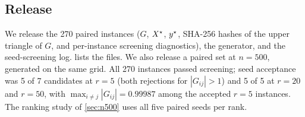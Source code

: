\subsection{Release}
We release the 270 paired instances ($G$, $X^\star$, $y^\star$, SHA-256 hashes of the
upper triangle of $G$, and per-instance screening diagnostics), the generator,
and the seed-screening log.  lists the files.
We also release a paired set at $n=500$, generated on the same grid. All 270
instances passed screening; seed acceptance was 5 of 7 candidates at $r=5$
(both rejections for $|G_{ij}|>1$) and 5 of 5 at $r=20$ and $r=50$, with
$\max_{i\ne j}|G_{ij}|=0.99987$ among the accepted $r=5$ instances. The
ranking study of \cref{sec:n500} uses all five paired seeds per rank.
